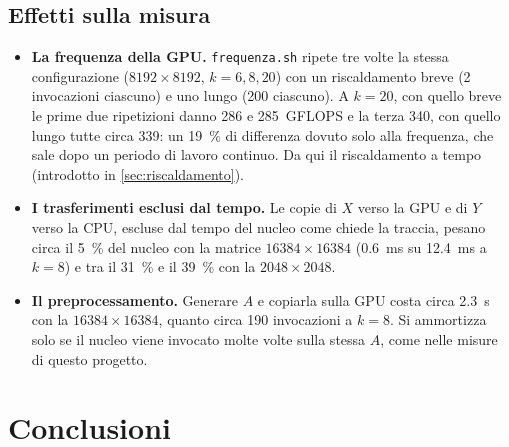 \documentclass[11pt,a4paper]{article}
\begin{document}
\subsection{Effetti sulla misura}\label{sec:ris-effetti}
\begin{itemize}
  \item \textbf{La frequenza della GPU.} \texttt{frequenza.sh} ripete tre volte
        la stessa configurazione ($8192 \times 8192$, $k = 6, 8, 20$) con un
        riscaldamento breve (2 invocazioni ciascuno) e uno lungo (200 ciascuno). A $k = 20$, con
        quello breve le prime due ripetizioni danno 286 e 285~GFLOPS e la terza
        340, con quello lungo tutte circa 339: un \SI{19}{\percent} di
        differenza dovuto solo alla frequenza, che sale dopo un periodo di
        lavoro continuo. Da qui il riscaldamento a tempo
        (introdotto in \cref{sec:riscaldamento}).
  \item \textbf{I trasferimenti esclusi dal tempo.} Le copie di $X$ verso la
        GPU e di $Y$ verso la CPU, escluse dal tempo del nucleo come chiede la
        traccia, pesano circa il \SI{5}{\percent} del
        nucleo con la matrice $16384 \times 16384$ (\SI{0.6}{ms} su
        \SI{12.4}{ms} a $k = 8$) e tra il \SI{31}{\percent} e il
        \SI{39}{\percent} con la $2048 \times 2048$.
  \item \textbf{Il preprocessamento.} Generare $A$ e copiarla sulla GPU costa
        circa \SI{2.3}{s} con la $16384 \times 16384$, quanto circa 190
        invocazioni a $k = 8$. Si ammortizza solo se il nucleo viene invocato
        molte volte sulla stessa $A$, come nelle misure di questo progetto.
\end{itemize}


\section{Conclusioni}\label{sec:conclusioni}
\end{document}
